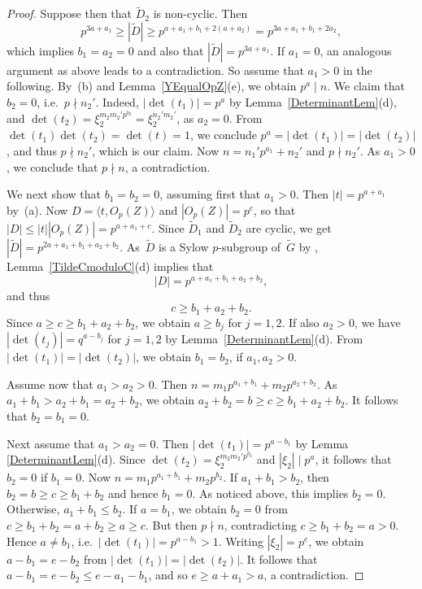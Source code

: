 \documentclass[12pt]{amsart}
\theoremstyle{theorem}
\theoremstyle{definition}
\theoremstyle{remark}
\begin{document}
\begin{proof}
Suppose then that $\tilde{D}_2$ is non-cyclic. 
Then
$$p^{3a + a_1} \geq |\tilde{D}| \geq p^{a + a_1 + b_1 + 2(a+a_2)}
= p^{3a + a_1 + b_1 + 2 a_2},$$
which implies $b_1 = a_2 = 0$ and also that $|\tilde{D}| = p^{3a + a_1}$.
If $a_1 = 0$, an analogous argument as above leads to a contradiction. So assume
that $a_1 > 0$ in the following. By~(b) and Lemma~\ref{YEqualOpZ}(e), we obtain
$p^a \mid n$. We claim that $b_2 = 0$, i.e.\ $p \nmid n_2'$. Indeed,
$|\det(t_1)| = p^a$ by Lemma~\ref{DeterminantLem}(d), and 
$\det(t_2) = \xi_2^{m_2m_2'p^{b_2}} = \xi_2^{n_2'm_2'}$, as $a_2 = 0$. From 
$\det( t_1 ) \det(t_2) = \det(t) = 1$, we conclude $p^a = |\det(t_1)| 
= |\det(t_2)|$, and thus $p \nmid n_2'$, which is our claim. Now 
$n = n_1'p^{a_1} + n_2'$ and $p \nmid n_2'$. As $a_1 > 0$, we conclude that 
$p \nmid n$, a contradiction.

We next show that $b_1 = b_2 = 0$, assuming first that $a_1 > 0$. Then 
$|t| = p^{a+a_1}$ by~(a). Now $D = \langle t, O_p(Z) \rangle$ and 
$|O_p(Z)| = p^c$, so that $|D| \leq |t||O_p(Z)| = p^{a+a_1+c}$.
Since $\tilde{D}_1$ and $\tilde{D}_2$ are cyclic, we get $|\tilde{D}| =
p^{2a + a_1 + b_1 + a_2 + b_2}$. As~$\tilde{D}$ is a Sylow $p$-subgroup
of~$\tilde{G}$ by \cite[Corollary~$3.6.2$]{HL25}, 
Lemma~\ref{TildeCmoduloC}(d) implies that
\begin{equation}
\label{FirstDEstimate}
|D| = p^{a + a_1 + b_1 + a_2 + b_2},
\end{equation}
and thus
\begin{equation}
\label{cEstimate}
c \geq b_1 + a_2 + b_2.
\end{equation}
Since $a \geq c \geq b_1 + a_2 + b_2$, we obtain $a \geq b_j$ for $j = 1, 2$.
If also $a_2 > 0$, we have $|\det(t_j)| = q^{a-b_j}$ for $j = 1, 2$ by
Lemma~\ref{DeterminantLem}(d). From $|\det(t_1)| = |\det(t_2)|$, we obtain 
$b_1 = b_2$, if $a_1, a_2 > 0$. 

Assume now that $a_1 > a_2 > 0$. Then 
$n = m_1 p^{a_1 + b_1} + m_2 p^{a_2 + b_2}$. As $a_1 + b_1 > a_2 + b_1
= a_2 + b_2$, we obtain $a_2 + b_2 = b \geq c \geq b_1 + a_2 + b_2$. It follows
that $b_2 = b_1 = 0$.

Next assume that $a_1 > a_2 = 0$. Then $|\det(t_1)| = p^{a-b_1}$ by
Lemma \ref{DeterminantLem}(d). Since $\det(t_2) = \xi_2^{m_2m_2'p^{b_2}}$ and 
$|\xi_2| \mid p^a$, it follows that $b_2 = 0$ if $b_1 = 0$. Now 
$n = m_1 p^{a_1 + b_1} + m_2 p^{b_2}$. If $a_1 + b_1 > b_2$, then 
$b_2 = b \geq c \geq b_1 + b_2$ and hence $b_1 = 0$. As noticed above, this 
implies $b_2 = 0$.  Otherwise, $a_1 + b_1 \leq b_2$. If $a = b_1$, we obtain 
$b_2 = 0$ from $c \geq b_1 + b_2 = a + b_2 \geq a \geq c$. But then 
$p \nmid n$, contradicting $c \geq b_1 + b_2 = a > 0$. Hence $a \neq b_1$, 
i.e.\ $|\det(t_1)| = p^{a-b_1} > 1$. Writing
$|\xi_2| = p^e$, we obtain $a - b_1 = e - b_2$ from $|\det(t_1)| = |\det(t_2)|$. 
It follows that $a - b_1 = e - b_2 \leq e - a_1 - b_1$, and so
$e \geq a + a_1 > a$, a contradiction.


\end{proof}
\end{document}

